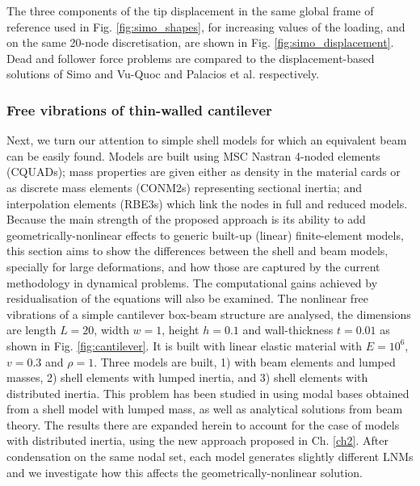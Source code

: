 \documentclass[11pt]{article}
\begin{document}
The three components of the tip displacement in the same global frame of reference used in Fig. \ref{fig:simo_shapes}, for increasing values of the loading, and on the same 20-node discretisation, are shown in Fig. \ref{fig:simo_displacement}. Dead and follower force problems are compared to the displacement-based solutions of Simo and Vu-Quoc \cite{Simo1986a} and Palacios et al. \cite{Palacios2010} respectively.
%



\subsubsection{Free vibrations of thin-walled cantilever}

Next, we turn our attention to simple shell models for which an equivalent beam can be easily found. Models are built using MSC Nastran 4-noded elements (CQUADs); mass properties are given either as density in the material cards  or as discrete mass elements (CONM2s) representing sectional inertia; and interpolation elements (RBE3s) which link the nodes in full and reduced models. Because the main strength of the proposed approach is its ability to add geometrically-nonlinear effects to  generic built-up (linear) finite-element models, this section aims to show the differences between the shell and beam models, specially for large deformations, and how those are captured by the current methodology in dynamical problems. The computational gains achieved by residualisation of the equations will also be examined.
The nonlinear free vibrations of a simple cantilever box-beam structure are analysed, the dimensions are length $L =20$, width $w = 1$, height $h = 0.1$ and wall-thickness $t = 0.01$ as shown in Fig. \ref{fig:cantilever}. It is built with linear elastic material with $E=10^6$, $v = 0.3$ and $\rho = 1$. Three models are built, 1) with beam elements and lumped masses, 2) shell elements with lumped inertia, and 3) shell elements with distributed inertia. This problem has been studied in \cite{Wang2015} using modal bases obtained from a shell model with lumped mass, as well as analytical solutions from beam theory. The results there are expanded herein to account for the case of models with distributed inertia, using the new approach proposed in Ch. \ref{ch2}. After condensation on the same nodal set, each model generates slightly different LNMs and we investigate how this affects the geometrically-nonlinear solution.
\end{document}
